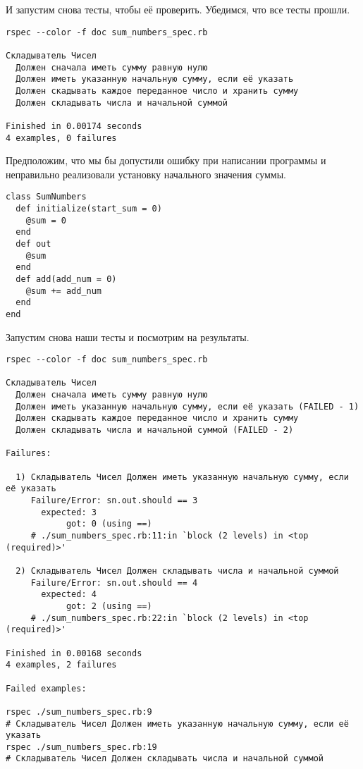 И запустим снова тесты, чтобы её проверить. Убедимся, что все тесты прошли.

\begin{verbatim}
rspec --color -f doc sum_numbers_spec.rb 

Складыватель Чисел
  Должен сначала иметь сумму равную нулю
  Должен иметь указанную начальную сумму, если её указать
  Должен скадывать каждое переданное число и хранить сумму
  Должен складывать числа и начальной суммой

Finished in 0.00174 seconds
4 examples, 0 failures
\end{verbatim}

Предположим, что мы бы допустили ошибку при написании программы и неправильно реализовали установку начального значения суммы.

\begin{verbatim}
class SumNumbers
  def initialize(start_sum = 0)
    @sum = 0
  end
  def out
    @sum
  end
  def add(add_num = 0)
    @sum += add_num
  end
end
\end{verbatim}

Запустим снова наши тесты и посмотрим на результаты.

\begin{verbatim}
rspec --color -f doc sum_numbers_spec.rb 

Складыватель Чисел
  Должен сначала иметь сумму равную нулю
  Должен иметь указанную начальную сумму, если её указать (FAILED - 1)
  Должен скадывать каждое переданное число и хранить сумму
  Должен складывать числа и начальной суммой (FAILED - 2)

Failures:

  1) Складыватель Чисел Должен иметь указанную начальную сумму, если её указать
     Failure/Error: sn.out.should == 3
       expected: 3
            got: 0 (using ==)
     # ./sum_numbers_spec.rb:11:in `block (2 levels) in <top (required)>'

  2) Складыватель Чисел Должен складывать числа и начальной суммой
     Failure/Error: sn.out.should == 4
       expected: 4
            got: 2 (using ==)
     # ./sum_numbers_spec.rb:22:in `block (2 levels) in <top (required)>'

Finished in 0.00168 seconds
4 examples, 2 failures

Failed examples:

rspec ./sum_numbers_spec.rb:9
# Складыватель Чисел Должен иметь указанную начальную сумму, если её указать
rspec ./sum_numbers_spec.rb:19
# Складыватель Чисел Должен складывать числа и начальной суммой
\end{verbatim}

